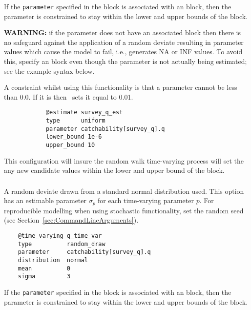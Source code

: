 If the \texttt{parameter} specified in the  block is associated with an  block, then the parameter is constrained to stay within the lower and upper bounds of the  block.

\textbf{WARNING:} if the parameter does not have an associated  block then there is no safeguard against the application of a random deviate resulting in parameter values which cause the model to fail, i.e., generates NA or INF values. To avoid this, specify an  block even though the parameter is not actually being estimated; see the example syntax below.

A constraint whilst using this functionality is that a parameter cannot be less than 0.0. If it is then \CNAME\ sets it equal to 0.01.

{\small{\begin{verbatim}
			@estimate survey_q_est
			type      uniform
			parameter catchability[survey_q].q
			lower_bound 1e-6
			upper_bound 10
\end{verbatim}}}

This configuration will insure the random walk time-varying process will set the any new candidate values within the lower and upper bound of the  block.

\subsubsection[Random Draw]{}\label{sec:TimeVarying-RandomDraw}

A random deviate drawn from a standard normal distribution used. This option has an estimable parameter $\sigma_p$ for each time-varying parameter $p$. For reproducible modelling when using stochastic functionality, set the random seed (see Section~\ref{sec:CommandLineArguments}).

{\small{\begin{verbatim}
	@time_varying q_time_var
	type          random_draw
	parameter     catchability[survey_q].q
	distribution  normal
	mean          0
	sigma         3
\end{verbatim}}}

If the \texttt{parameter} specified in the  block is associated with an  block, then the parameter is constrained to stay within the lower and upper bounds of the  block.

